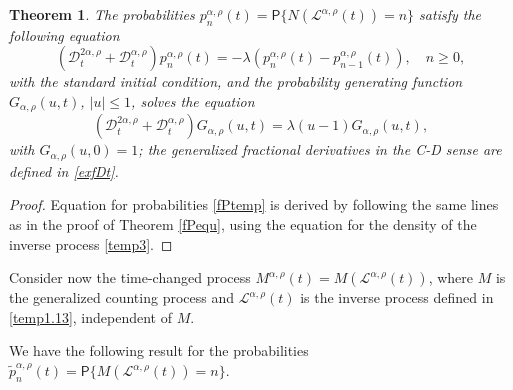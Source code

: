 \documentclass[12pt]{article}
\theoremstyle{definition}
\theoremstyle{plain}
\newtheorem{theorem}{Theorem}
\newcommand{\Prob}{\mathsf{P}}
\begin{document}
\begin{theorem}\label{fP2equ}
	The probabilities ${p}^{\alpha,\rho}_n(t)=\Prob\{N(\mathcal{L}^{\alpha,\rho}(t))=n\}$ satisfy the following  equation
	\begin{equation}\label{fPtemp}
		\left({\mathcal D}^{2\alpha,\rho}_t + {\mathcal D}^{\alpha,\rho}_t\right) p_n^{\alpha,\rho}(t) = -\lambda(p_n^{\alpha,\rho}(t) - p_{n-1}^{\alpha,\rho}(t)), \quad n \ge 0,
	\end{equation}
	with the standard initial condition, and  the probability generating function $%
	{G}_{\alpha,\rho}(u, t)$, $|u| \leq 1$, solves the equation
	\begin{equation*}%
		\left({\mathcal D}^{2\alpha,\rho}_t + {\mathcal D}^{\alpha,\rho}_t\right) G_{\alpha,\rho}(u, t) = \lambda(u - 1)G_{\alpha,\rho}(u, t), 
	\end{equation*}
	with $G_{\alpha,\rho}(u, 0) = 1$; the generalized fractional derivatives  in the C-D sense are defined in \eqref{exfDt}.
\end{theorem}
\begin{proof}
	Equation for probabilities \eqref{fPtemp} is derived by following the same lines as in the proof of Theorem \ref{fPequ},  using the  equation for the density of the inverse process \eqref{temp3}.
\end{proof}


Consider now the time-changed process $M^{\alpha,\rho}(t)=M(\mathcal{L}^{\alpha,\rho}(t))$, where $M$ is the generalized counting process and $\mathcal{L}^{\alpha,\rho}(t)$ is the inverse process defined in \eqref{temp1.13}, independent of $M$.

We have the following result for the probabilities ${\tilde p}_n^{\alpha,\rho}(t)=\Prob\{M(\mathcal{L}^{\alpha,\rho}(t))=n\}$.
\end{document}
